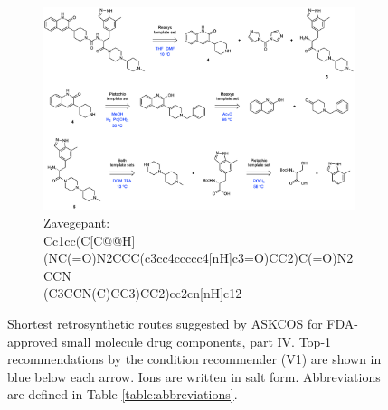 \documentclass[pdflatex,sn-mathphys-num]{sn-jnl}%
\theoremstyle{thmstyleone}%
\theoremstyle{thmstyletwo}%
\theoremstyle{thmstylethree}%
\begin{document}
\begin{figure}[h!]
    \captionsetup[subfigure]{labelformat=empty}
    \begin{subfigure}[t]{1.0\textwidth}
        \includegraphics[scale=0.725]{media/SI_study/11.zavegepant.png}
        \caption{Zavegepant: \\ \small Cc1cc(C[C@@H](NC(=O)N2CCC(c3cc4ccccc4[nH]c3=O)CC2)C(=O)N2CCN \\ (C3CCN(C)CC3)CC2)cc2cn[nH]c12}
    \end{subfigure}
    \hfill
    \vspace{1cm}
    \caption{Shortest retrosynthetic routes suggested by ASKCOS for FDA-approved small molecule drug components, part IV. Top-1 recommendations by the condition recommender (V1) are shown in blue below each arrow. Ions are written in salt form. Abbreviations are defined in Table \ref{table:abbreviations}.}
    \label{fig:fda_study_4}
\end{figure}

\clearpage
\end{document}
